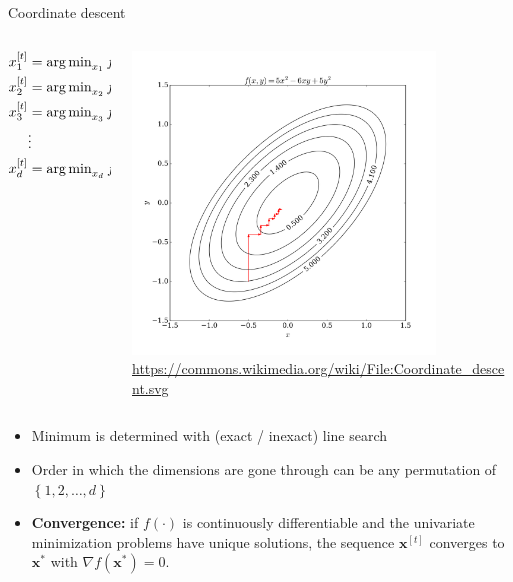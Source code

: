 \documentclass[11pt,compress,t,notes=noshow, xcolor=table]{beamer}
\begin{document}
\begin{vbframe}{Coordinate descent}
\begin{columns}
\begin{column}{.4\textwidth}
\begin{scriptsize}
\begin{align*}
x^{[t]}_1 &= \operatorname{arg\,min}_{x_1} f(x_1, x^{[t-1]}_2, x^{[t-1]}_3, \hdots, x^{[t-1]}_d) \\
x^{[t]}_2 &= \operatorname{arg\,min}_{x_2} f(x^{[t]}_1, x_2, x^{[t-1]}_3, \hdots, x^{[t-1]}_d) \\
x^{[t]}_3 &= \operatorname{arg\,min}_{x_3} f(x^{[t]}_1, x^{[t]}_2, x_3, \hdots, x^{[t-1]}_d) \\
&\vdots \\
x^{[t]}_d &= \operatorname{arg\,min}_{x_d} f(x^{[t]}_1, x^{[t]}_2, x^{[t]}_3, \hdots, x_d) \\
\end{align*}
\end{scriptsize}
\end{column}
\begin{column}{.5\textwidth}
\begin{center}
\vspace*{-0.3cm}
\includegraphics[width=0.8\textwidth]{figure_man/Coordinate_descent.png} \\
\tiny{\url{https://commons.wikimedia.org/wiki/File:Coordinate_descent.svg}}
\end{center}\end{column}
\end{columns}

\framebreak

\begin{itemize}
\item Minimum is determined with (exact / inexact) line search
\item Order in which the dimensions are gone through can be any permutation of $\left\{1,2,\hdots,d\right\}$
\item \textbf{Convergence:} if $f(\cdot)$ is continuously differentiable and the univariate minimization problems have unique
solutions, the sequence $\bm{x}^{[t]}$ converges to $\bm{x}^{*}$ with $\nabla f(\bm{x}^*) = 0$.


\end{itemize}
\end{vbframe}
\end{document}
